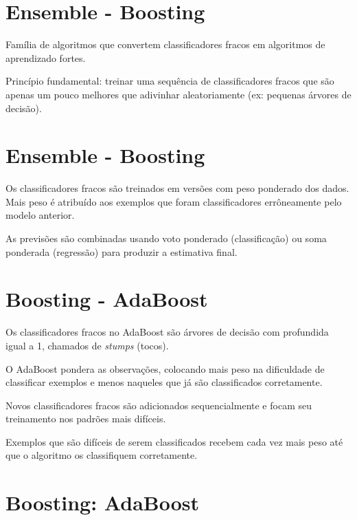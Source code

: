 \documentclass[11pt]{article}
\begin{document}
    \hypertarget{ensemble---boosting}{%
\section{Ensemble - Boosting}\label{ensemble---boosting}}

Família de algoritmos que convertem classificadores fracos em algoritmos
de aprendizado fortes.

Princípio fundamental: treinar uma sequência de classificadores fracos
que são apenas um pouco melhores que adivinhar aleatoriamente (ex:
pequenas árvores de decisão).

    \hypertarget{ensemble---boosting}{%
\section{Ensemble - Boosting}\label{ensemble---boosting}}

Os classificadores fracos são treinados em versões com peso ponderado
dos dados. Mais peso é atribuído aos exemplos que foram classificadores
errôneamente pelo modelo anterior.

As previsões são combinadas usando voto ponderado (classificação) ou
soma ponderada (regressão) para produzir a estimativa final.

    \hypertarget{boosting---adaboost}{%
\section{Boosting - AdaBoost}\label{boosting---adaboost}}

Os classificadores fracos no AdaBoost são árvores de decisão com
profundida igual a 1, chamados de \emph{stumps} (tocos).

O AdaBoost pondera as observações, colocando mais peso na dificuldade de
classificar exemplos e menos naqueles que já são classificados
corretamente.

Novos classificadores fracos são adicionados sequencialmente e focam seu
treinamento nos padrões mais difíceis.

Exemplos que são difíceis de serem classificados recebem cada vez mais
peso até que o algoritmo os classifiquem corretamente.

    \hypertarget{boosting-adaboost}{%
\section{Boosting: AdaBoost}\label{boosting-adaboost}}
\end{document}
